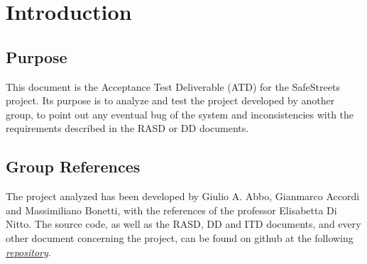\documentclass[../ATD.tex]{subfiles}
\begin{document}
    \chapter{Introduction}\label{ch:introduction}
    \section{Purpose}\label{sec:purpose}
    This document is the Acceptance Test Deliverable (ATD) for the SafeStreets project.
    Its purpose is to analyze and test the project developed by another group, to point out any eventual bug of the system and inconsistencies with the requirements described in the RASD or DD documents.
    \section{Group References}\label{sec:group-references}
    The project analyzed has been developed by Giulio A. Abbo, Gianmarco Accordi and Massimiliano Bonetti, with the references of the professor Elisabetta Di Nitto.
    The source code, as well as the RASD, DD and ITD documents, and every other document concerning the project, can be found on github at the following \href{https://github.com/gianfi12/AbboAccordiBonetti}{\emph{repository}}.
\end{document}
